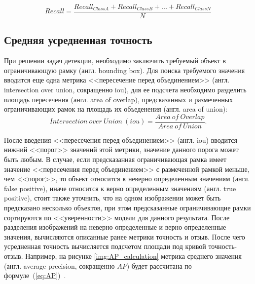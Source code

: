 \begin{equation}
\label{eq:recall}
Recall = \frac{Recall_{Class A} + Recall_{Class B} + ... + Recall_{Class N}}{N}
\end{equation}




\subsection{Средняя усредненная точность}
При решении задач детекции, необходимо заключить требуемый объект в ограничивающую рамку (англ. bounding box).
Для поиска требуемого значения вводится еще одна метрика <<пересечение перед объединением>> (англ. intersection over union, сокращенно iou),
для ее подсчета необходимо разделить площадь пересечения (англ. area of overlap), предсказанных и  размеченных ограничивающих рамок на площадь их объеденения (англ. area of union):
\begin{equation}
Intersection\ over\ Union\ (iou) = \frac{Area\ of\ Overlap}{Area\ of\ Union}.
\end{equation}

После введения <<пересечения перед объединением>> (англ. iou) вводится нижний <<порог>>  значений этой метрики, значение данного порога может быть любым. В случае, 
если предсказанная ограничивающая рамка имеет значение <<пересечения перед объединением>> с размеченной рамкой меньше, чем <<порог>>, то объект относится  к неверно определенным значениям (англ. false positive), 
иначе относится к верно определенным значениям (англ. true positive), стоит также уточнить, что на одном изображении может быть предсказано несколько объектов, при этом предсказанные ограничивающие рамки сортируются по <<уверенности>> модели для данного результата.
После разделения изображений на неверно определенные и верно определенные значения, вычисляются описанные ранее метрики точность и отзыв.
После чего усредненная точность вычисляется подсчетом площади под кривой точность-отзыв. Например, на рисунке \ref{img:AP_calculation} метрика
среднего значения (англ. average precision, сокращенно $AP$) будет рассчитана по формуле~(\ref{eq:AP})~\cite{mAP}.

